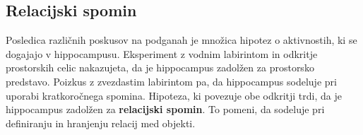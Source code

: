 \documentclass[10pt,a4paper]{article}
\begin{document}
\subsection{Relacijski spomin}
Posledica različnih poskusov na podganah je množica hipotez o aktivnostih, ki se dogajajo v hippocampusu. Eksperiment z vodnim labirintom in odkritje prostorskih celic nakazujeta, da je hippocampus zadolžen za prostorsko predstavo. Poizkus z zvezdastim labirintom pa, da hippocampus sodeluje pri uporabi kratkoročnega spomina. Hipoteza, ki povezuje obe odkritji trdi, da je hippocampus zadolžen za \textbf{relacijski spomin}. To pomeni, da sodeluje pri definiranju in hranjenju relacij med objekti.
\end{document}
